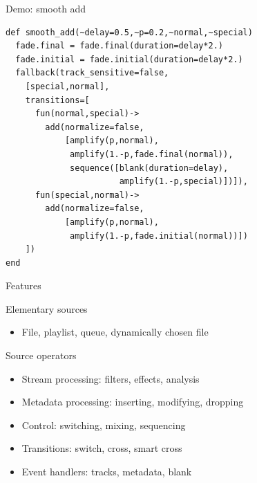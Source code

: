 \documentclass{beamer}
\begin{document}
\begin{frame}[fragile]{Demo: smooth add}

\vspace{0.3cm}

\begin{lstlisting}
def smooth_add(~delay=0.5,~p=0.2,~normal,~special)
  fade.final = fade.final(duration=delay*2.)
  fade.initial = fade.initial(duration=delay*2.)
  fallback(track_sensitive=false,
    [special,normal],
    transitions=[
      fun(normal,special)->
        add(normalize=false,
            [amplify(p,normal),
             amplify(1.-p,fade.final(normal)),
             sequence([blank(duration=delay),
                       amplify(1.-p,special)])]),
      fun(special,normal)->
        add(normalize=false,
            [amplify(p,normal),
             amplify(1.-p,fade.initial(normal))])
    ])
end
\end{lstlisting}


\end{frame}


\begin{frame}{Features}

\begin{block}{Elementary sources}
\begin{itemize}
\item File, playlist, queue, dynamically chosen file
\end{itemize}
\end{block}

\begin{block}{Source operators}
\begin{itemize}
\item Stream processing: filters, effects, analysis
\item Metadata processing: inserting, modifying, dropping
\item Control: switching, mixing, sequencing
\item Transitions: switch, cross, smart cross
\item Event handlers: tracks, metadata, blank
\end{itemize}
\end{block}

\end{frame}
\end{document}
